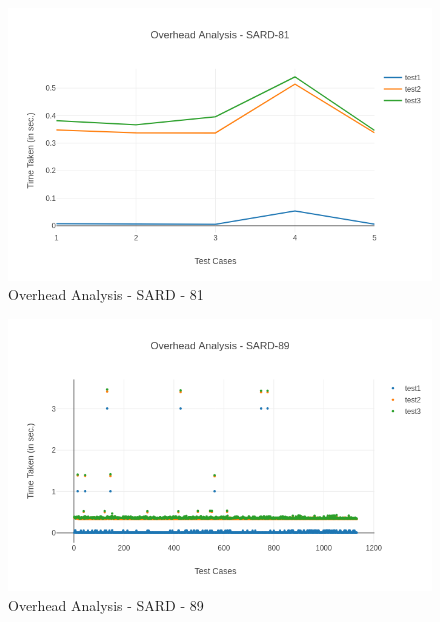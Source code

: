 \begin{figure}
\begin{centering}
\includegraphics[width=140mm]{images/sard81_overhead.png}
\caption{Overhead Analysis - SARD - 81\label{fig:fig411}}
\par\end{centering}
\end{figure}

\begin{figure}
\begin{centering}
\includegraphics[width=140mm]{images/sard89_overhead.png}
\caption{Overhead Analysis - SARD - 89\label{fig:fig412}}
\par\end{centering}
\end{figure}

